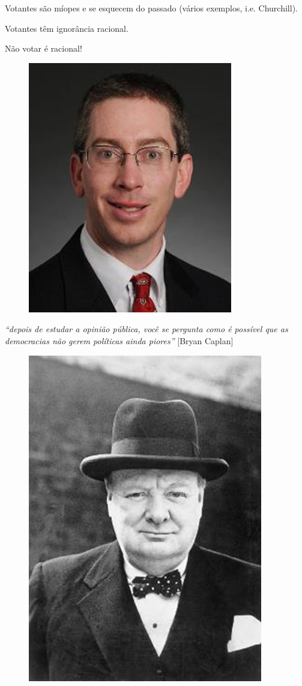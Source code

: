 \documentclass[a4paper,12pt]{article}[abntex2]
\begin{document}
Votantes são míopes e se esquecem do passado (vários exemplos, i.e. Churchill).

Votantes têm ignorância racional.

Não votar é racional! 

\begin{figure}[H]
    \centering
    \includegraphics[width=0.7\linewidth]{Imagens/a15i7.png}
\end{figure}

\textit{“depois de estudar a opinião pública, você se pergunta como é possível que as democracias não gerem políticas ainda piores”} [Bryan Caplan]

\begin{figure}[H]
    \centering
    \includegraphics[width=0.7\linewidth]{Imagens/a15i8.png}
\end{figure}
\end{document}
